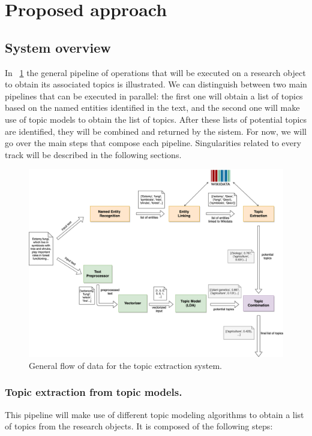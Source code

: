 \documentclass[runningheads]{llncs}
\begin{document}
\section{Proposed approach} \label{proposed_approach}
\subsection{System overview}
In \figurename~\ref{complete_system} the general pipeline of operations that will be executed on a research object to obtain its associated topics is illustrated. We can distinguish between two main pipelines that can be executed in parallel: the first one will obtain a list of topics based on the named entities identified in the text, and the second one will make use of topic models to obtain the list of topics. After these lists of potential topics are identified, they will be combined and returned by the sistem. For now, we will go over the main steps that compose each pipeline. Singularities related to every track will be described in the following sections.

\begin{figure}[h]
	\includegraphics[width=\textwidth]{img/complete_system.png}
	\caption{General flow of data for the topic extraction system.} \label{complete_system}
\end{figure}

\subsubsection{Topic extraction from topic models.}
This pipeline will make use of different topic modeling algorithms to obtain a list of topics from the research objects. It is composed of the following steps:
\end{document}
